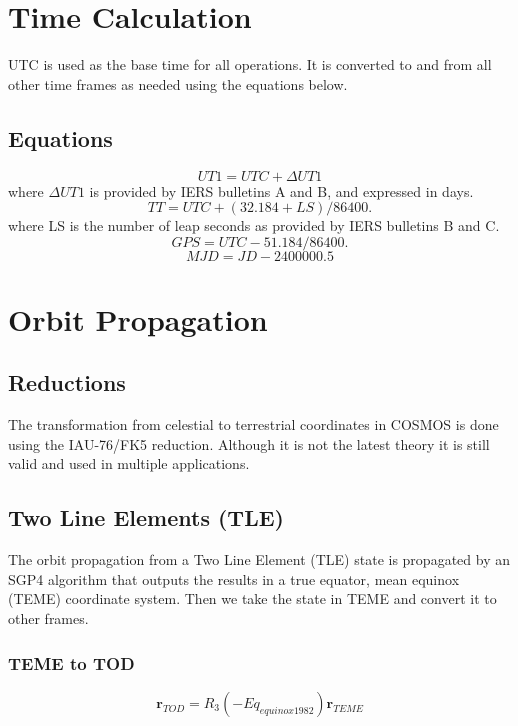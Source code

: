 \documentclass[12pt,letterpaper]{paper}
\begin{document}
\section{Time Calculation}
UTC is used as the base time for all operations. It is converted to and from all other time frames as needed using the equations below.
\subsection{Equations}
\begin{equation}
UT1 = UTC + {\Delta}UT1
\end{equation}
where ${\Delta}UT1$ is provided by IERS bulletins A and B, and expressed in days.
\begin{equation}
TT = UTC + (32.184 + LS)/86400.
\end{equation}
where LS is the number of leap seconds as provided by IERS bulletins B and C.
\begin{equation}
GPS = UTC - 51.184/86400.
\end{equation}
\begin{equation}
MJD = JD - 2400000.5
\end{equation}

\section{Orbit Propagation}

\subsection{Reductions}
The transformation from celestial to terrestrial coordinates in COSMOS is done using the IAU-76/FK5 reduction. Although it is not the latest theory it is still valid and used in multiple applications.
\subsection{Two Line Elements (TLE)}

The orbit propagation from a Two Line Element (TLE) state is propagated by an SGP4 algorithm that outputs the results in a true equator, mean equinox (TEME) coordinate system. Then we take the state in TEME and convert it to other frames.

\subsubsection{TEME to TOD}
\begin{equation}
\mathbf{r}_{TOD} = R_3(-Eq_{equinox1982}) \mathbf{r}_{TEME}
\end{equation}
\end{document}
